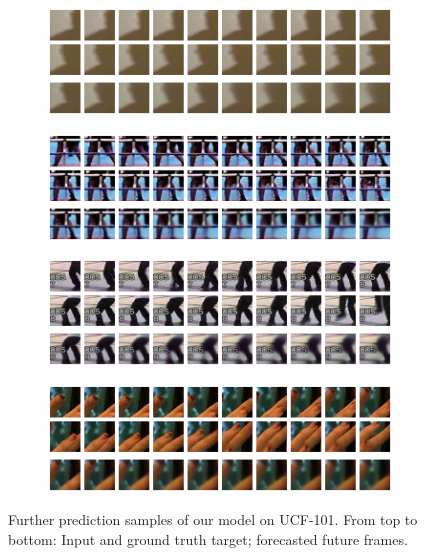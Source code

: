 \begin{figure}[h!tb]
\centering
\begin{subfigure}{0.49\textwidth}
  \centering
  \includegraphics[width=0.92\linewidth]{figures/pred/ucf/random/pred-01.png}
  \caption{}
  \label{fig:ucf-random2a}
  \vspace{.1cm}
\end{subfigure}
\begin{subfigure}{0.49\textwidth}
  \centering
  \includegraphics[width=0.92\linewidth]{figures/pred/ucf/random/pred-02.png}
  \caption{}
  \label{fig:ucf-random2b}
  \vspace{.1cm}
\end{subfigure}
\begin{subfigure}{0.49\textwidth}
  \centering
  \includegraphics[width=0.92\linewidth]{figures/pred/ucf/random/pred-03.png}
  \caption{}
  \label{fig:ucf-random2c}
  \vspace{.1cm}
\end{subfigure}
\begin{subfigure}{0.49\textwidth}
  \centering
  \includegraphics[width=0.92\linewidth]{figures/pred/ucf/random/pred-05.png}
  \caption{}
  \label{fig:ucf-random2d}
  \vspace{.1cm}
\end{subfigure}
\caption[Random Prediction Samples on UCF-101]{Further prediction samples of our model on UCF-101. From top to bottom: Input and ground truth target; forecasted future frames.}
\label{fig:ucf-random2}
\end{figure}

